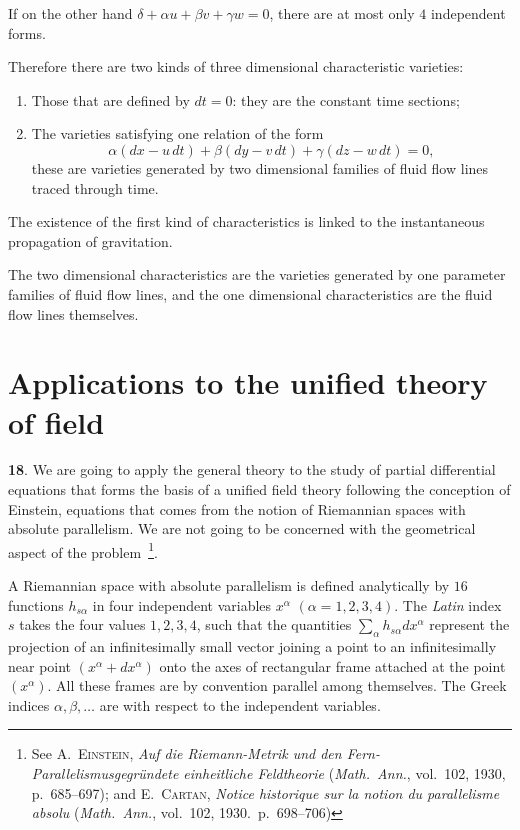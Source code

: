 \documentclass[leqno,11pt]{article}
\theoremstyle{shape1}
\theoremstyle{shape0}
\theoremstyle{shape2}
\theoremstyle{definition}
\begin{document}
If on the other hand $\delta+\alpha u+\beta v+\gamma w=0$, there are at most only $4$ independent forms.

Therefore there are two kinds of three dimensional characteristic varieties:

\begin{enumerate}
\item Those that are defined by $dt=0$: they are the constant time sections;
\item The varieties satisfying one relation of the form
\[
\alpha(dx-u\,dt)+\beta(dy-v\,dt)+\gamma(dz-w\,dt)=0,
\]
these are varieties generated by two dimensional families of fluid flow lines traced through time.
\end{enumerate}

The existence of the first kind of characteristics is linked to the instantaneous propagation of gravitation.

The two dimensional characteristics are the varieties generated by one parameter families of fluid flow lines, and the one dimensional characteristics are the fluid flow lines themselves.


\section{Applications to the unified theory of field}
\label{sec:appl-unit-theory}

\textbf{18}. We are going to apply the general theory to the study of partial differential equations that forms the basis of a unified field theory following the conception of Einstein, equations that comes from the notion of Riemannian spaces with absolute parallelism. We are not going to be concerned with the geometrical aspect of the problem~\footnote{See \textsc{A.~Einstein}, \emph{Auf die Riemann-Metrik und den Fern-Parallelismusgegr\"undete einheitliche Feldtheorie} (\emph{Math.\ Ann.}, vol.\ 102, 1930, p.\ 685--697); and \textsc{E.~Cartan}, \emph{Notice historique sur la notion du parallelisme absolu} (\emph{Math.\ Ann.}, vol.~102, 1930.\ p.\ 698--706)}.

A Riemannian space with absolute parallelism is defined analytically by $16$ functions $h_{s\alpha}$ in four independent variables $x^{\alpha}$ $(\alpha=1,2,3,4)$. The \emph{Latin} index $s$ takes the four values $1,2,3,4$, such that the quantities $\sum_{\alpha}h_{s\alpha}dx^{\alpha}$ represent the projection of an infinitesimally small vector joining a point to an infinitesimally near point $(x^{\alpha}+dx^{\alpha})$ onto the axes of rectangular frame attached at the point $(x^{\alpha})$. All these frames are by convention parallel among themselves. The Greek indices $\alpha,\beta, \dots$ are with respect to the independent variables.
\end{document}
